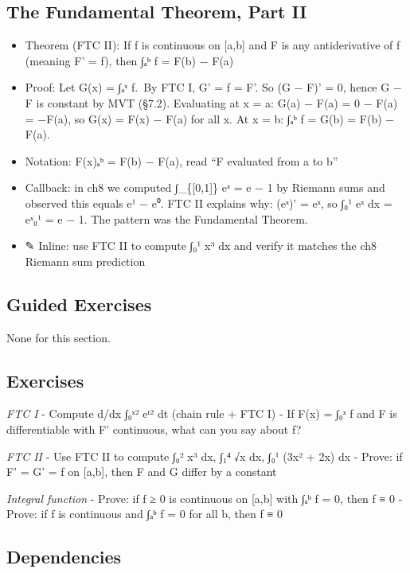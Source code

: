 \documentclass[
  10pt,
  letterpaper,
]{scrbook}
\providecommand{\tightlist}{%
  \setlength{\itemsep}{0pt}\setlength{\parskip}{0pt}}
\begin{document}
\subsection{The Fundamental Theorem, Part
II}\label{the-fundamental-theorem-part-ii}

\begin{itemize}
\tightlist
\item
  Theorem (FTC II): If f is continuous on {[}a,b{]} and F is any
  antiderivative of f (meaning F' = f), then ∫ₐᵇ f = F(b) − F(a)
\item
  Proof: Let G(x) = ∫ₐˣ f.~By FTC I, G' = f = F'. So (G − F)' = 0, hence
  G − F is constant by MVT (§7.2). Evaluating at x = a: G(a) − F(a) = 0
  − F(a) = −F(a), so G(x) = F(x) − F(a) for all x. At x = b: ∫ₐᵇ f =
  G(b) = F(b) − F(a).
\item
  Notation: F(x)\textbar ₐᵇ = F(b) − F(a), read ``F evaluated from a to
  b''
\item
  Callback: in ch8 we computed ∫\_\{{[}0,1{]}\} eˣ = e − 1 by Riemann
  sums and observed this equals e¹ − e⁰. FTC II explains why: (eˣ)' =
  eˣ, so ∫₀¹ eˣ dx = eˣ\textbar₀¹ = e − 1. The pattern was the
  Fundamental Theorem.
\item
  ✎ Inline: use FTC II to compute ∫₀¹ x³ dx and verify it matches the
  ch8 Riemann sum prediction
\end{itemize}

\subsection{Guided Exercises}\label{guided-exercises-19}

None for this section.

\subsection{Exercises}\label{exercises-38}

\emph{FTC I} - Compute d/dx ∫₀ˣ² eᵗ² dt (chain rule + FTC I) - If F(x) =
∫₀ˣ f and F is differentiable with F' continuous, what can you say about
f?

\emph{FTC II} - Use FTC II to compute ∫₀² x³ dx, ∫₁⁴ √x dx, ∫₀¹ (3x² +
2x) dx - Prove: if F' = G' = f on {[}a,b{]}, then F and G differ by a
constant

\emph{Integral function} - Prove: if f ≥ 0 is continuous on {[}a,b{]}
with ∫ₐᵇ f = 0, then f ≡ 0 - Prove: if f is continuous and ∫ₐᵇ f = 0 for
all b, then f ≡ 0

\subsection{Dependencies}\label{dependencies-38}
\end{document}
